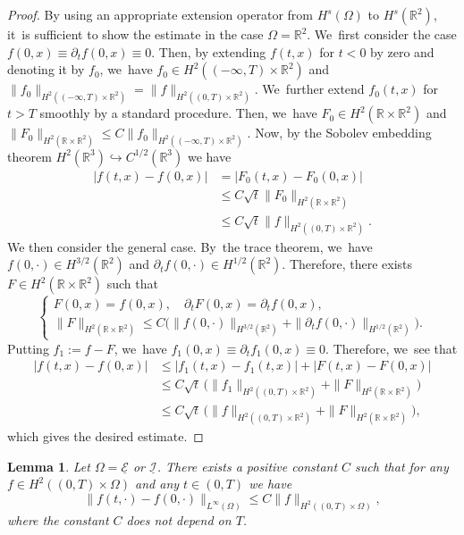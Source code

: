\documentclass[10pt]{amsart}
\newcommand{\R}{{\mathbb R}}
\newcommand{\dt}{\partial_t}
\newcommand{\cI}{{\mathcal I}}
\newcommand{\cE}{{\mathcal E}}
\newcommand{\ul}[1]{\underline{#1}}
\newtheorem{lemma}[theorem]{Lemma}
\theoremstyle{definition}
\begin{document}
\begin{proof}
By using an appropriate extension operator from $H^s(\Omega)$ to $H^s(\R^2)$, it~is sufficient to show the estimate in the case $\Omega=\R^2$. We~first consider the case $f(0,x)\equiv \dt f(0,x)\equiv0$.
Then, by extending $f(t,x)$ for $t<0$ by zero and denoting it by $f_0$, we~have $f_0\in H^2((-\infty,T)\times\R^2)$ and $\|f_0\|_{H^2((-\infty,T)\times\R^2)}=\|f\|_{H^2((0,T)\times\R^2)}$. We~further extend $f_0(t,x)$ for $t>T$ smoothly by a standard procedure.
Then, we~have $F_0\in H^2(\R\times\R^2)$ and
$\|F_0\|_{H^2(\R\times\R^2)} \leq C\|f_0\|_{H^2((-\infty,T)\times\R^2)}$.
Now, by the Sobolev embedding theorem $H^2(\R^3) \hookrightarrow C^{1/2}(\R^3)$ we have
\begin{align*}
|f(t,x)-f(0,x)|
&= |F_0(t,x)-F_0(0,x)| \\
&\leq C\sqrt{t}\|F_0\|_{H^2(\R\times\R^2)} \\
&\leq C\sqrt{t}\|f\|_{H^2((0,T)\times\R^2)}.
\end{align*}
We then consider the general case. By~the trace theorem, we~have $f(0,\cdot) \in H^{3/2}(\R^2)$ and $\dt f(0,\cdot) \in H^{1/2}(\R^2)$.
Therefore, there exists $F\in H^2(\R\times\R^2)$ such that
\[
\begin{cases}
F(0,x)=f(0,x), \quad \dt F(0,x)=\dt f(0,x), \\
\|F\|_{H^2(\R\times\R^2)}
\leq C(\|f(0,\cdot)\|_{H^{3/2}(\R^2)} + \|\dt f(0,\cdot)\|_{H^{1/2}(\R^2)} \bigr).
\end{cases}
\]
Putting $f_1:=f-F$, we~have $f_1(0,x)\equiv \dt f_1(0,x)\equiv0$.
Therefore, we~see that
\begin{align*}
|f(t,x)-f(0,x)|
&\leq |f_1(t,x)-f_1(t,x)| + |F(t,x)-F(0,x)| \\
&\leq C\sqrt{t}\, \bigl(\|f_1\|_{H^2((0,T)\times\R^2)} + \|F\|_{H^2(\R\times\R^2)} \bigr) \\
&\leq C\sqrt{t}\, \bigl(\|f\|_{H^2((0,T)\times\R^2)} + \|F\|_{H^2(\R\times\R^2)} \bigr),
\end{align*}
which gives the desired estimate.
\end{proof}

\begin{lemma}\label{lem:Embedding2}
Let $\Omega=\ul{\cE}$ or $\ul{\cI}$.
There exists a positive constant $C$ such that for any $f\in H^2((0,T)\times\Omega)$
and any $t\in(0,T)$ we have
\[
\|f(t,\cdot)-f(0,\cdot)\|_{L^\infty(\Omega)} \leq C \|f\|_{H^2((0,T)\times\Omega)},
\]
where the constant $C$ does not depend on $T$.
\end{lemma}
\end{document}
